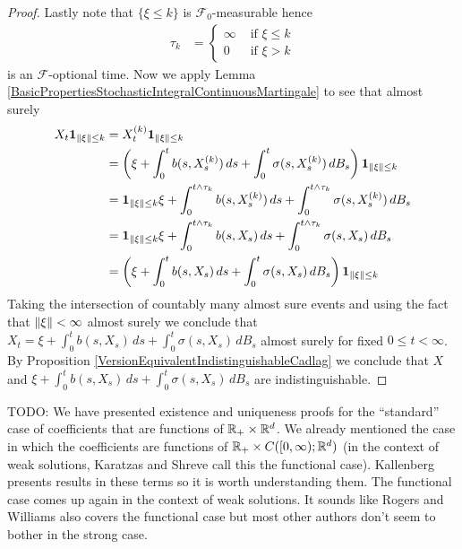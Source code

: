 \begin{proof}
Lastly note that
$\lbrace \xi \leq k \rbrace$ is $\mathcal{F}_0$-measurable hence 
\begin{align*}
\tau_k &= \begin{cases}
\infty & \text{ if $\xi \leq k$} \\
0 & \text{ if $\xi > k$}
\end{cases}
\end{align*}
is an $\mathcal{F}$-optional time.  Now we apply Lemma \ref{BasicPropertiesStochasticIntegralContinuousMartingale} to see that almost surely
\begin{align*}
X_t \textbf{1}_{\lVert \xi \rVert \leq k } &= X_t^{(k)} \textbf{1}_{\lVert \xi \rVert \leq k } \\
&= \left( \xi + \int_0^t b(s, X^{(k)}_s) \, ds + \int_0^t \sigma(s, X^{(k)}_s) \, dB_s \right) \textbf{1}_{\lVert \xi \rVert \leq k }  \\
&=\textbf{1}_{\lVert \xi \rVert \leq k } \xi + \int_0^{t \wedge \tau_k}  b(s, X^{(k)}_s) \, ds + \int_0^{t \wedge \tau_k} \sigma(s, X^{(k)}_s) \, dB_s \\
&=\textbf{1}_{\lVert \xi \rVert \leq k } \xi + \int_0^{t \wedge \tau_k}  b(s, X_s) \, ds + \int_0^{t \wedge \tau_k} \sigma(s, X_s) \, dB_s \\
&= \left( \xi + \int_0^t b(s, X_s) \, ds + \int_0^t \sigma(s, X_s) \, dB_s \right) \textbf{1}_{\lVert \xi \rVert \leq k } \\
\end{align*}
Taking the intersection of countably many almost sure events and using the fact that $\lVert \xi \rVert < \infty$ almost surely we conclude that
$X_t = \xi + \int_0^t b(s, X_s) \, ds + \int_0^t \sigma(s, X_s) \, dB_s$ almost surely for fixed $0 \leq t < \infty$.  By Proposition \ref{VersionEquivalentIndistinguishableCadlag}
we conclude that $X$ and $\xi + \int_0^t b(s, X_s) \, ds + \int_0^t \sigma(s, X_s) \, dB_s$ are indistinguishable.
\end{proof}

TODO: We have presented existence and uniqueness proofs for the ``standard'' case of coefficients that are functions of $\mathbb{R}_+ \times \mathbb{R}^d$.  We already mentioned the case in which the coefficients are functions of $\mathbb{R}_+ \times C([0,\infty); \mathbb{R}^d)$ (in the context of weak solutions,  Karatzas and Shreve call this the functional case).   Kallenberg presents results in these terms so it is worth understanding them.  The functional case comes up again in the context of weak solutions.  It sounds like Rogers and Williams also covers the functional case but most other authors don't seem to bother in the strong case.

